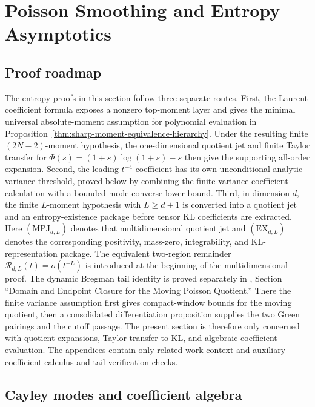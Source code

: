\section{Poisson Smoothing and Entropy Asymptotics}%
\label{sec:entropy-asymptotics}

\subsection*{Proof roadmap}
\label{sec:entropy-theorem-map}
\label{subsec:intro-hypotheses-scope}

The entropy proofs in this section follow three separate routes.  First, the
Laurent coefficient formula exposes a nonzero top-moment layer and gives the
minimal universal absolute-moment assumption for polynomial evaluation in
Proposition~\ref{thm:sharp-moment-equivalence-hierarchy}.  Under the resulting
finite \((2N-2)\)-moment hypothesis, the one-dimensional quotient jet and
finite Taylor transfer for \(\Phi(s)=(1+s)\log(1+s)-s\) then give the
supporting all-order expansion.  Second, the leading \(t^{-4}\) coefficient
has its own unconditional analytic variance threshold, proved below by
combining the finite-variance coefficient calculation with a bounded-mode
converse lower bound.  Third, in dimension \(d\), the finite
\(L\)-moment hypothesis with \(L\ge d+1\) is converted into a quotient jet and
an entropy-existence package before tensor KL coefficients are extracted.
Here \((\mathrm{MPJ}_{d,L})\) denotes that multidimensional quotient jet and
\((\mathrm{EX}_{d,L})\) denotes the corresponding positivity, mass-zero,
integrability, and KL-representation package.  The equivalent two-region
  remainder \(\mathcal R_{d,L}(t)=o(t^{-L})\) is introduced at the beginning of
the multidimensional proof.
The dynamic Bregman tail identity is proved separately in
, Section ``Domain and Endpoint Closure for the
Moving Poisson Quotient.''  There the finite variance assumption
first gives compact-window bounds for the moving quotient, then a consolidated
differentiation proposition supplies the two Green pairings and the cutoff
passage.  The present section is therefore only concerned with quotient
expansions, Taylor transfer to KL, and algebraic coefficient evaluation.
The appendices contain only related-work context and auxiliary
coefficient-calculus and tail-verification checks.

\subsection{Cayley modes and coefficient algebra}


